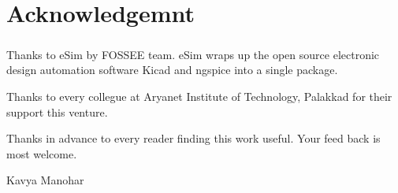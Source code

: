 \chapter*{Acknowledgemnt}

\paragraph{}

Thanks to eSim by FOSSEE team. eSim wraps up the open source electronic design automation software Kicad and ngspice into a single package.

Thanks to every collegue at Aryanet Institute of Technology, Palakkad for their support this venture. 

Thanks in advance to every reader finding this work useful. Your feed back is most welcome.

\begin{flushright} Kavya Manohar \end{flushright}
